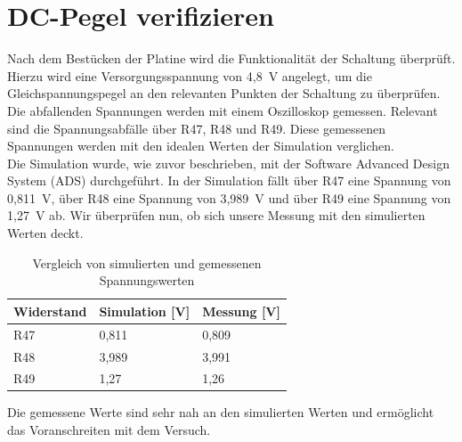 \section{DC-Pegel verifizieren}
Nach dem Bestücken der Platine wird die Funktionalität der Schaltung überprüft. Hierzu wird eine Versorgungsspannung von 4,8~V angelegt, um die Gleichspannungspegel an den relevanten Punkten der Schaltung zu überprüfen. Die abfallenden Spannungen werden mit einem Oszilloskop gemessen. Relevant sind die Spannungsabfälle über R47, R48 und R49. Diese gemessenen Spannungen werden mit den idealen Werten der Simulation verglichen.
\\
Die Simulation wurde, wie zuvor beschrieben, mit der Software Advanced Design System (ADS) durchgeführt. In der Simulation fällt über R47 eine Spannung von 0,811~V, über R48 eine Spannung von 3,989~V und über R49 eine Spannung von 1,27~V ab. Wir überprüfen nun, ob sich unsere Messung mit den simulierten Werten deckt.

\begin{table}[h]
    \centering
    \begin{tabular}{|l|l|l|}
        \hline
        \textbf{Widerstand} & \textbf{Simulation [V]} & \textbf{Messung [V]} \\
        \hline
        R47 & 0{,}811 & 0{,}809 \\
        \hline
        R48 & 3{,}989 & 3{,}991 \\
        \hline
        R49 & 1{,}27  & 1{,}26 \\
        \hline
    \end{tabular}
    \caption{Vergleich von simulierten und gemessenen Spannungswerten}
\end{table}
Die gemessene Werte sind sehr nah an den simulierten Werten und ermöglicht das Voranschreiten mit dem Versuch.
\clearpage

